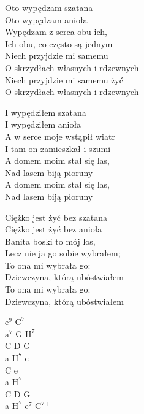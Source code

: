 \begin{text}
    Oto wypędzam szatana\\
    Oto wypędzam anioła\\
    Wypędzam z serca obu ich,\\
    Ich obu, co często są jednym\\
    Niech przyjdzie mi samemu\\
    O skrzydłach własnych i rdzewnych\\
    Niech przyjdzie mi samemu żyć\\
    O skrzydłach własnych i rdzewnych

    I wypędziłem szatana\\
    I wypędziłem anioła\\
    A w serce moje wstąpił wiatr\\
    I tam on zamieszkał i szumi\\
    A domem moim stał się las,\\
    Nad lasem biją pioruny\\
    A domem moim stał się las,\\
    Nad lasem biją pioruny

    Ciężko jest żyć bez szatana\\
    Ciężko jest żyć bez anioła\\
    Banita boski to mój los,\\
    Lecz nie ja go sobie wybrałem;\\
    To ona mi wybrała go:\\
    Dziewczyna, którą ubóstwiałem\\
    To ona mi wybrała go:\\
    Dziewczyna, którą ubóstwiałem
\end{text}
\begin{chord}
    $\mathrm{e^{9}}$ $\mathrm{C^{7+}}$\\
    $\mathrm{a^{7}}$ G $\mathrm{H^{7}}$\\
    C D G\\
    a $\mathrm{H^{7}}$ e\\
    C e\\
    a $\mathrm{H^{7}}$\\
    C D G\\
    a $\mathrm{H^{7}}$ $\mathrm{e^{7}}$ $\mathrm{C^{7+}}$
\end{chord}
